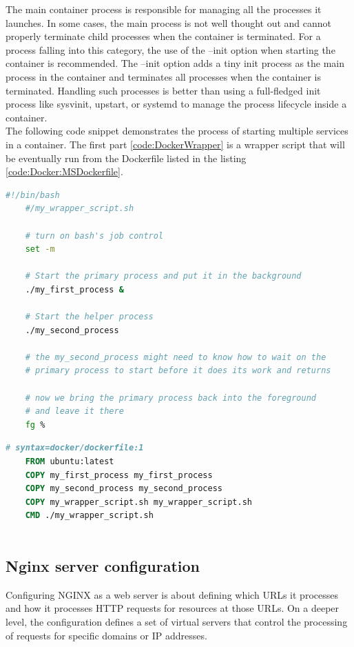 The main container process is responsible for managing all the processes it launches. In some cases, the main process is not well thought out and cannot properly terminate child processes when the container is terminated. For a process falling into this category, the use of the --init option when starting the container is recommended. The --init option adds a tiny init process as the main process in the container and terminates all processes when the container is terminated. Handling such processes is better than using a full-fledged init process like sysvinit, upstart, or systemd to manage the process lifecycle inside a container.\cite{dockerMultipleService}\\

The following code snippet demonstrates the process of starting multiple services in a container. The first part \ref{code:DockerWrapper} is a wrapper script that will be eventually run from the Dockerfile listed in the listing \ref{code:Docker:MSDockerfile}.
\begin{lstlisting}[language=bash,
	caption={Wrapper script \cite{dockerMultipleService}}, 
	label={code:DockerWrapper}]
	#!/bin/bash
	#/my_wrapper_script.sh

	# turn on bash's job control
	set -m
	
	# Start the primary process and put it in the background
	./my_first_process &
	
	# Start the helper process
	./my_second_process
	
	# the my_second_process might need to know how to wait on the
	# primary process to start before it does its work and returns
	
	# now we bring the primary process back into the foreground
	# and leave it there
	fg %
\end{lstlisting}

\begin{lstlisting}[language=dockerfile,
	caption={Example Dockerfile for running multiple services \cite{dockerMultipleService}}, 
	label={code:Docker:MSDockerfile}]
	# syntax=docker/dockerfile:1
	FROM ubuntu:latest
	COPY my_first_process my_first_process
	COPY my_second_process my_second_process
	COPY my_wrapper_script.sh my_wrapper_script.sh
	CMD ./my_wrapper_script.sh
	
\end{lstlisting}

\subsection{Nginx server configuration}
\label{Impl:NginxConfig}
Configuring NGINX as a web server is about defining which URLs it processes and how it processes HTTP requests for resources at those URLs. On a deeper level, the configuration defines a set of virtual servers that control the processing of requests for specific domains or IP addresses.\\


